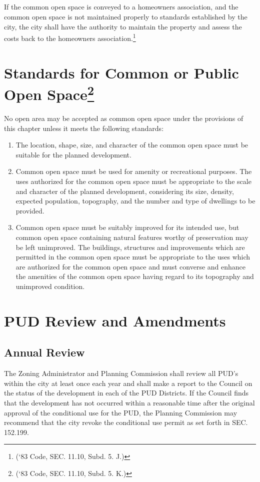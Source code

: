 \subsection{}
If the common open space is conveyed to a homeowners association, and the common open space is not maintained properly to standards established by the city, the city shall have the authority to maintain the property and assess the costs back to the homeowners association.\footnote{(‘83 Code, SEC. 11.10, Subd. 5. J.)}

\section{Standards for Common or Public Open Space\footnote{(‘83 Code, SEC. 11.10, Subd. 5. K.)}}
No open area may be accepted as common open space under the provisions of this chapter unless it meets the following standards:
\begin{enumerate}[{\indent}A)]
    \item The location, shape, size, and character of the common open space must be suitable for the planned development.
    \item Common open space must be used for amenity or recreational purposes. The uses authorized for the common open space must be appropriate to the scale and character of the planned development, considering its size, density, expected population, topography, and the number and type of dwellings to be provided.
    \item Common open space must be suitably improved for its intended use, but common open space containing natural features worthy of preservation may be left unimproved. The buildings, structures and improvements which are permitted in the common open space must be appropriate to the uses which are authorized for the common open space and must converse and enhance the amenities of the common open space having regard to its topography and unimproved condition.
\end{enumerate}

\section{PUD Review and Amendments}
\subsection{Annual Review}
The Zoning Administrator and Planning Commission shall review all PUD’s within the city at least once each year and shall make a report to the Council on the status of the development in each of the PUD Districts. If the Council finds that the development has not occurred within a reasonable time after the original approval of the conditional use for the PUD, the Planning Commission may recommend that the city revoke the conditional use permit as set forth in SEC. 152.199.

